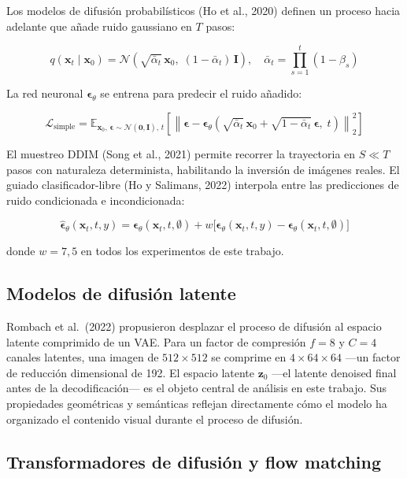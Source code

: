 \documentclass[12pt, a4paper, twoside]{book}
\newcommand{\z}{\mathbf{z}}
\newcommand{\x}{\mathbf{x}}
\newcommand{\eps}{\boldsymbol{\epsilon}}
\newcommand{\E}{\mathbb{E}}
\begin{document}
Los modelos de difusión probabilísticos (Ho et al., 2020) definen un proceso hacia adelante que añade ruido gaussiano en $T$ pasos:

\begin{equation}
q(\x_t \mid \x_0) = \mathcal{N}\!\left(\sqrt{\bar{\alpha}_t}\,\x_0,\; (1 - \bar{\alpha}_t)\,\mathbf{I}\right),
\quad \bar{\alpha}_t = \prod_{s=1}^t (1 - \beta_s)
\end{equation}

La red neuronal $\eps_\theta$ se entrena para predecir el ruido añadido:

\begin{equation}
\mathcal{L}_{\text{simple}} = \E_{\x_0,\,\eps \sim \mathcal{N}(\mathbf{0},\mathbf{I}),\,t}\!
\left[\left\|\eps - \eps_\theta\!\left(\sqrt{\bar{\alpha}_t}\,\x_0 + \sqrt{1 - \bar{\alpha}_t}\,\eps,\;t\right)\right\|_2^2\right]
\end{equation}

El muestreo DDIM (Song et al., 2021) permite recorrer la trayectoria en $S \ll T$ pasos con naturaleza determinista, habilitando la inversión de imágenes reales. El guiado clasificador-libre (Ho y Salimans, 2022) interpola entre las predicciones de ruido condicionada e incondicionada:

\begin{equation}
\hat{\eps}_\theta(\x_t, t, y) = \eps_\theta(\x_t, t, \emptyset)
+ w\bigl[\eps_\theta(\x_t, t, y) - \eps_\theta(\x_t, t, \emptyset)\bigr]
\end{equation}

donde $w = 7{,}5$ en todos los experimentos de este trabajo.

\subsection{Modelos de difusión latente}

Rombach et al.\ (2022) propusieron desplazar el proceso de difusión al espacio latente comprimido de un VAE. Para un factor de compresión $f = 8$ y $C = 4$ canales latentes, una imagen de $512 \times 512$ se comprime en $4 \times 64 \times 64$ ---un factor de reducción dimensional de 192. El espacio latente $\z_0$ ---el latente denoised final antes de la decodificación--- es el objeto central de análisis en este trabajo. Sus propiedades geométricas y semánticas reflejan directamente cómo el modelo ha organizado el contenido visual durante el proceso de difusión.

\subsection{Transformadores de difusión y flow matching}
\end{document}
